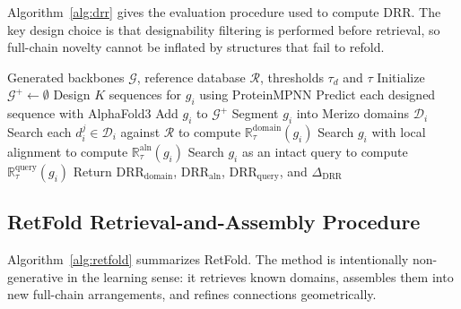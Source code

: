 \documentclass[letterpaper]{article} %
\begin{document}
Algorithm~\ref{alg:drr} gives the evaluation procedure used to compute DRR. The key design choice is that designability filtering is performed before retrieval, so full-chain novelty cannot be inflated by structures that fail to refold.

\begin{algorithm}[t]
\caption{Designability-first DRR evaluation}
\label{alg:drr}
\begin{algorithmic}[1]
\REQUIRE Generated backbones $\mathcal{G}$, reference database $\mathcal{R}$, thresholds $\tau_d$ and $\tau$
\STATE Initialize $\mathcal{G}^{+} \leftarrow \emptyset$
    \STATE Design $K$ sequences for $g_i$ using ProteinMPNN
    \STATE Predict each designed sequence with AlphaFold3
        \STATE Add $g_i$ to $\mathcal{G}^{+}$
    \ENDIF
\ENDFOR
{}
    \STATE Segment $g_i$ into Merizo domains $\mathcal{D}_i$
    \STATE Search each $d_i^j \in \mathcal{D}_i$ against $\mathcal{R}$ to compute $\mathbb{R}^{\mathrm{domain}}_\tau(g_i)$
    \STATE Search $g_i$ with local alignment to compute $\mathbb{R}^{\mathrm{aln}}_\tau(g_i)$
    \STATE Search $g_i$ as an intact query to compute $\mathbb{R}^{\mathrm{query}}_\tau(g_i)$
\ENDFOR
\STATE Return $\mathrm{DRR}_{\mathrm{domain}}$, $\mathrm{DRR}_{\mathrm{aln}}$, $\mathrm{DRR}_{\mathrm{query}}$, and $\Delta_{\mathrm{DRR}}$
\end{algorithmic}
\end{algorithm}

\subsection{RetFold Retrieval-and-Assembly Procedure}

Algorithm~\ref{alg:retfold} summarizes RetFold. The method is intentionally non-generative in the learning sense: it retrieves known domains, assembles them into new full-chain arrangements, and refines connections geometrically.
\end{document}
